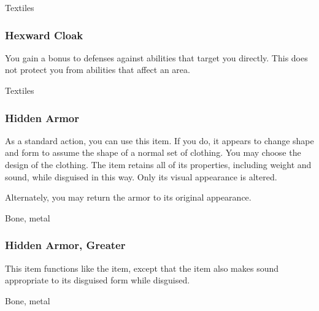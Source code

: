  


 Textiles


\lowercase{\hypertarget{item:Hexward Cloak}{}}\label{item:Hexward Cloak}
\hypertarget{item:Hexward Cloak}{\subsubsection{Hexward Cloak\hfill{}}}

You gain a  bonus to defenses against  abilities that target you directly.
This does not protect you from abilities that affect an area.



 


 Textiles


\lowercase{\hypertarget{item:Hidden Armor}{}}\label{item:Hidden Armor}
\hypertarget{item:Hidden Armor}{\subsubsection{Hidden Armor\hfill{}}}

As a standard action, you can use this item.
If you do, it appears to change shape and form to assume the shape of a normal set of clothing.
You may choose the design of the clothing.
The item retains all of its properties, including weight and sound, while disguised in this way.
Only its visual appearance is altered.

Alternately, you may return the armor to its original appearance.



 


 Bone, metal


\lowercase{\hypertarget{item:Hidden Armor, Greater}{}}\label{item:Hidden Armor, Greater}
\hypertarget{item:Hidden Armor, Greater}{\subsubsection{Hidden Armor, Greater\hfill{}}}

This item functions like the  item, except that the item also makes sound appropriate to its disguised form while disguised.



 


 Bone, metal


